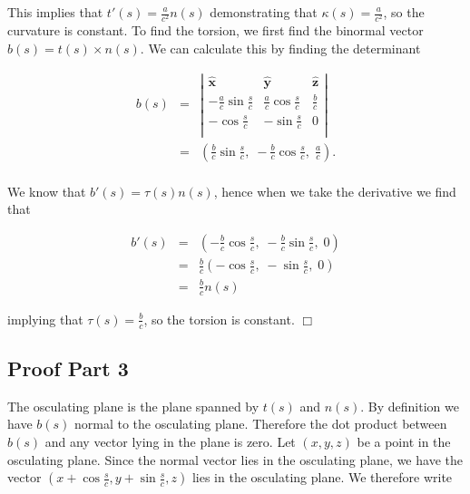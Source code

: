 \documentclass{article}
\begin{document}
\noindent This implies that $t'(s) = \frac{a}{c^2} n(s)$ demonstrating that $\kappa(s) = \frac{a}{c^2}$, so the curvature is constant.  To find the torsion, we first find the binormal vector $b(s) = t(s) \times n(s)$.  We can calculate this by finding the determinant

\begin{eqnarray*}
b(s) & = & \left | \begin{array}{ccc}
\hat{\textbf{x}} & \hat{\textbf{y}} & \hat{\textbf{z}} \\
- \frac{a}{c} \sin \frac{s}{c} & \frac{a}{c} \cos \frac{s}{c} & \frac{b}{c} \\
- \cos \frac{s}{c} & - \sin \frac{s}{c} & 0 \\
\end{array} \right | \\
& = & \left ( \frac{b}{c} \sin \frac{s}{c}, \; - \frac{b}{c} \cos \frac{s}{c}, \; \frac{a}{c} \right ). \\
\end{eqnarray*}

\noindent We know that $b'(s) = \tau(s) n(s)$, hence when we take the derivative we find that

\begin{eqnarray*}
b'(s) & =  & \left ( - \frac{b}{c} \cos \frac{s}{c}, \; - \frac{b}{c} \sin \frac{s}{c}, \; 0 \right ) \\
& = & \frac{b}{c} \left ( - \cos \frac{s}{c}, \; - \sin \frac{s}{c} , \; 0 \right ) \\
& = & \frac{b}{c} n(s)
\end{eqnarray*}

\noindent implying that $\tau(s) =\frac{b}{c}$, so the torsion is constant. \hfill $\Box$


\subsection*{Proof Part 3}

\noindent The osculating plane is the plane spanned by $t(s)$ and $n(s)$.  By definition we have $b(s)$ normal to the osculating plane.  Therefore the dot product between $b(s)$ and any vector lying in the plane is zero.  Let $(x,y,z)$ be a point in the osculating plane.  Since the normal vector lies in the osculating plane, we have the vector $ \left ( x + \cos \frac{s}{c}, y + \sin \frac{s}{c}, z \right )$ lies in the osculating plane.  We therefore write
\end{document}
